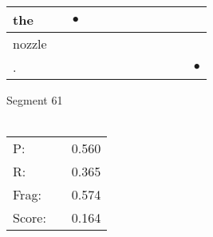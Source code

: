 \documentclass[landscape]{article}
\newcommand{\ssp}{\hspace{2pt}}
\newcommand{\mex}{\cellcolor{g}$\bullet$}
\begin{document}
\begin{tabular}{|l|p{10pt}|p{10pt}|p{10pt}|p{10pt}|p{10pt}|p{10pt}|p{10pt}|p{10pt}|p{10pt}|p{10pt}|p{10pt}|}
\hline
\ssp \cellcolor{ref1}the \ssp&\hspace{2pt}&\hspace{2pt}\mex&\hspace{2pt}&\hspace{2pt}&\hspace{2pt}&\hspace{2pt}&\hspace{2pt}&\hspace{2pt}&\hspace{2pt}&\hspace{2pt}&\hspace{2pt}\\
\hline
\ssp nozzle \ssp&\hspace{2pt}&\hspace{2pt}&\hspace{2pt}&\hspace{2pt}&\hspace{2pt}&\hspace{2pt}&\hspace{2pt}&\hspace{2pt}&\hspace{2pt}&\hspace{2pt}&\hspace{2pt}\\
\hline
\ssp \cellcolor{ref10}. \ssp&\hspace{2pt}&\hspace{2pt}&\hspace{2pt}&\hspace{2pt}&\hspace{2pt}&\hspace{2pt}&\hspace{2pt}&\hspace{2pt}&\hspace{2pt}&\hspace{2pt}&\hspace{2pt}\mex\\
\hline
\end{tabular}

\vspace{6pt}
\noindent Segment 61\\\\
\noindent\begin{tabular}{lm{12pt}r}
\hline
P:&&0.560\\
R:&&0.365\\
Frag:&&0.574\\
Score:&&0.164\\
\end{tabular}
\end{document}
